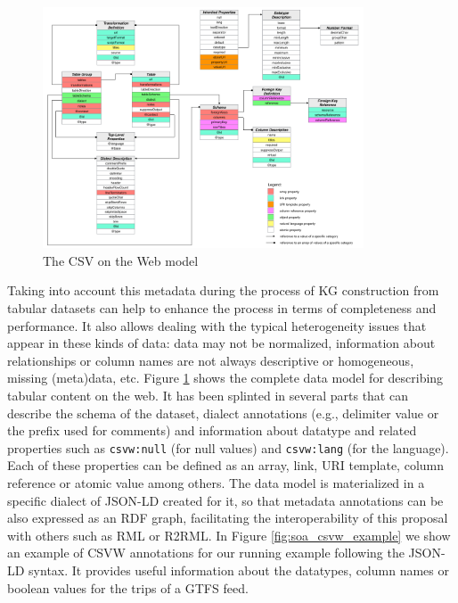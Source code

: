 \begin{figure}[!ht]
\centering
\includegraphics[width=0.85\textwidth]{figures/state-of-the-art/csvw-model.png}
\caption{The CSV on the Web model~\citep{tennison2015model}}
\label{fig:soa_csvw}
\end{figure}


Taking into account this metadata during the process of KG construction from tabular datasets can help to enhance the process in terms of completeness and performance. It also allows dealing with the typical heterogeneity issues that appear in these kinds of data: data may not be normalized, information about relationships or column names are not always descriptive or homogeneous, missing (meta)data, etc. Figure \ref{fig:soa_csvw} shows the complete data model for describing tabular content on the web. It has been splinted in several parts that can describe the schema of the dataset, dialect annotations (e.g., delimiter value or the prefix used for comments) and information about datatype and related properties such as \texttt{csvw:null} (for null values) and \texttt{csvw:lang} (for the language). Each of these properties can be defined as an array, link, URI template, column reference or atomic value among others. The data model is materialized in a specific dialect of JSON-LD created for it, so that metadata annotations can be also expressed as an RDF graph, facilitating the interoperability of this proposal with others such as RML or R2RML. In Figure \ref{fig:soa_csvw_example} we show an example of CSVW annotations for our running example following the JSON-LD syntax. It provides useful information about the datatypes, column names or boolean values for the trips of a GTFS feed.

